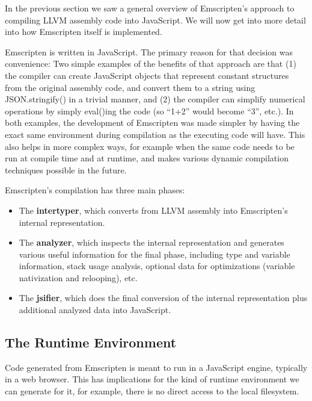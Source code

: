 \documentclass[preprint,10pt]{sigplanconf}
\begin{document}
In the previous section we saw a general overview of Emscripten's approach
to compiling LLVM assembly code into JavaScript. We will now get into more detail
into how Emscripten itself is implemented.

Emscripten is written in JavaScript. The primary reason for that decision
was convenience: Two simple examples of the benefits of that approach are that (1)
the compiler can create JavaScript objects that represent constant structures from the original
assembly code, and convert them to a string using JSON.stringify()
in a trivial manner,
and (2) the compiler can simplify numerical operations by simply
eval()ing the code (so ``1+2'' would become ``3'', etc.). In both examples,
the development of Emscripten was made simpler by having the exact same environment
during compilation as the executing code will have. This also helps in more
complex ways, for example when the same code needs to be run at compile time
and at runtime, and makes various dynamic compilation techniques possible in the future.

Emscripten's compilation has three main phases:
\begin{itemize}
\item The \textbf{intertyper}, which converts from LLVM assembly into
      Emscripten's internal representation.
\item The \textbf{analyzer}, which inspects the internal representation
      and generates various useful information for the final phase,
      including type and variable information, stack usage analysis,
      optional data for optimizations
      (variable nativization and relooping), etc.
\item The \textbf{jsifier}, which does the final conversion of the
      internal representation plus additional analyzed data into JavaScript.
\end{itemize}

\subsection{The Runtime Environment}
\label{sec:runtime}

Code generated from Emscripten is meant to run in a JavaScript engine,
typically in a web browser. This has implications for the kind of
runtime environment we can generate for it, for example, there is no
direct access to the local filesystem.
\end{document}
